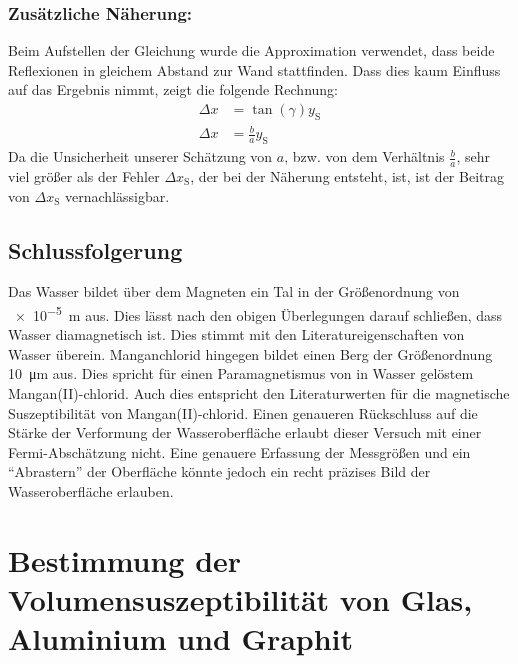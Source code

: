 \documentclass[
	a4paper,
	12pt,
	pagesize,
	ngerman
]{scrartcl}
\begin{document}
	\subsubsection*{Zusätzliche Näherung:}
	Beim Aufstellen der Gleichung wurde die Approximation verwendet, dass beide Reflexionen in gleichem Abstand zur Wand stattfinden. Dass dies kaum Einfluss auf das Ergebnis nimmt, zeigt die folgende Rechnung: 
	\begin{align}
		\Delta x &= \tan (\gamma) y_\text{S} \\
		\Delta x &= \frac{b}{a} y_\text{S}
	\end{align}
	Da die Unsicherheit unserer Schätzung von $a$, bzw. von dem Verhältnis $\frac{b}{a}$, sehr viel größer als der Fehler $\Delta x_\text{S}$, der bei der Näherung entsteht, ist, ist der Beitrag von $\Delta x_\text{S}$ vernachlässigbar.

	\subsection{Schlussfolgerung}
	Das Wasser bildet über dem Magneten ein Tal in der Größenordnung von \SI{e-5}{m} aus. Dies lässt nach den obigen Überlegungen darauf schließen, dass Wasser diamagnetisch ist. Dies stimmt mit den Literatureigenschaften von Wasser überein.
	Manganchlorid hingegen bildet einen Berg der Größenordnung \SI{10}{\micro \meter} aus. Dies spricht für einen Paramagnetismus von in Wasser gelöstem Mangan(II)-chlorid. Auch dies entspricht den Literaturwerten für die magnetische Suszeptibilität von Mangan(II)-chlorid. Einen genaueren Rückschluss auf die Stärke der Verformung der Wasseroberfläche erlaubt dieser Versuch mit einer Fermi-Abschätzung nicht. Eine genauere Erfassung der Messgrößen und ein \enquote{Abrastern} der Oberfläche könnte jedoch ein recht präzises Bild der Wasseroberfläche erlauben. %
	
	\section{Bestimmung der Volumensuszeptibilität von Glas, Aluminium und Graphit}
\end{document}
